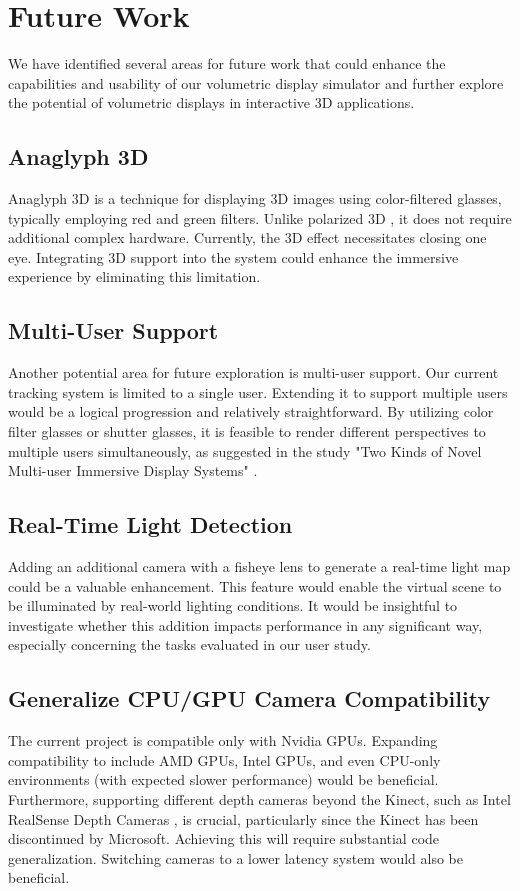 \section{Future Work}

We have identified several areas for future work that could enhance the capabilities and usability of our volumetric display simulator and further explore the potential of volumetric displays in interactive 3D applications.

\subsection{Anaglyph 3D}
Anaglyph 3D \cite{Dhaou2019} is a technique for displaying 3D images using color-filtered glasses, typically employing red and green filters. Unlike polarized 3D \cite{article-3D}, it does not require additional complex hardware. Currently, the 3D effect necessitates closing one eye. Integrating 3D support into the system could enhance the immersive experience by eliminating this limitation.

\subsection{Multi-User Support}
Another potential area for future exploration is multi-user support. Our current tracking system is limited to a single user. Extending it to support multiple users would be a logical progression and relatively straightforward. By utilizing color filter glasses or shutter glasses, it is feasible to render different perspectives to multiple users simultaneously, as suggested in the study "Two Kinds of Novel Multi-user Immersive Display Systems" \cite{Two-Kinds}.

\subsection{Real-Time Light Detection}
Adding an additional camera with a fisheye lens to generate a real-time light map could be a valuable enhancement. This feature would enable the virtual scene to be illuminated by real-world lighting conditions. It would be insightful to investigate whether this addition impacts performance in any significant way, especially concerning the tasks evaluated in our user study.

\subsection{Generalize CPU/GPU Camera Compatibility}
The current project is compatible only with Nvidia GPUs. Expanding compatibility to include AMD GPUs, Intel GPUs, and even CPU-only environments (with expected slower performance) would be beneficial. Furthermore, supporting different depth cameras beyond the Kinect, such as Intel RealSense Depth Cameras \cite{keselman2017intel}, is crucial, particularly since the Kinect has been discontinued by Microsoft. Achieving this will require substantial code generalization. Switching cameras to a lower latency system would also be beneficial.

